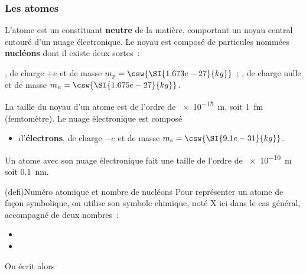 \documentclass[../../main/main.tex]{subfiles}
\begin{document}
\subsubsection{Les atomes}
L'atome est un constituant \textbf{neutre} de la matière, comportant un
noyau central entouré d'un nuage électronique. Le noyau est composé de
particules nommées \textbf{nucléons} dont il existe deux sortes~:
\begin{itemize}
	, de charge $+e$ et de masse $m_p =
		\csw{\SI{1.673e-27}{kg}}$~;
	, de charge nulle et de masse $m_n =
		\csw{\SI{1.675e-27}{kg}}$.
\end{itemize}
La taille du noyau d'un atome est de l'ordre de \SI{e-15}{m}, soit
\SI{1}{fm} (femtomètre).
\smallbreak
Le nuage électronique est composé
\begin{itemize}
	\item d'\textbf{électrons}, de charge $-e$ et de masse $m_e =
		      \csw{\SI{9.1e-31}{kg}}$.
\end{itemize}
Un atome avec son nuage électronique fait une taille de l'ordre de
\SI{e-10}{m} soit \SI{0.1}{nm}.

\begin{tcb}[label=def:numéroatomique,
		sidebyside, righthand ratio=.2](defi){Numéro atomique et nombre de nucléons}
	Pour représenter un atome de façon symbolique, on utilise son symbole
	chimique, noté X ici dans le cas général, accompagné de deux nombres~:
	\begin{itemize}
		\item {}
		\item {}
	\end{itemize}
	\tcblower
	On écrit alors
	\csw{
		\[
			\ce{^{A}_{Z}X}
		\]
	}
\end{tcb}
\end{document}
